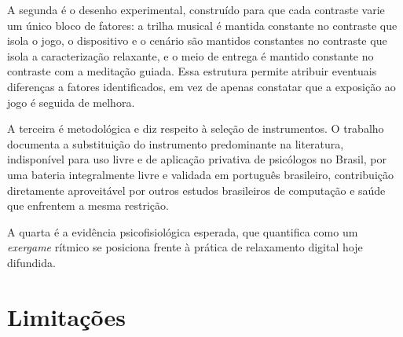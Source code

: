 A segunda é o desenho experimental, construído para que cada contraste varie um único bloco de fatores: a trilha musical é mantida constante no contraste que isola o jogo, o dispositivo e o cenário são mantidos constantes no contraste que isola a caracterização relaxante, e o meio de entrega é mantido constante no contraste com a meditação guiada. Essa estrutura permite atribuir eventuais diferenças a fatores identificados, em vez de apenas constatar que a exposição ao jogo é seguida de melhora.

A terceira é metodológica e diz respeito à seleção de instrumentos. O trabalho documenta a substituição do instrumento predominante na literatura, indisponível para uso livre e de aplicação privativa de psicólogos no Brasil, por uma bateria integralmente livre e validada em português brasileiro, contribuição diretamente aproveitável por outros estudos brasileiros de computação e saúde que enfrentem a mesma restrição.

A quarta é a evidência psicofisiológica esperada, que quantifica como um \textit{exergame} rítmico se posiciona frente à prática de relaxamento digital hoje difundida. 

\section{Limitações}\label{sec:conc-limitacoes}

